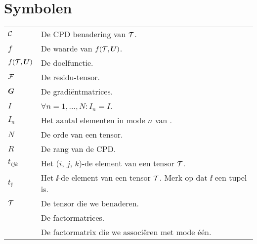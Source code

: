 \documentclass[master=cws ,masteroption=gs]{kulemt}
\begin{document}
\section*{Symbolen}
\begin{flushleft}
	\renewcommand{\arraystretch}{1.1}
	\begin{tabularx}{\textwidth}{@{}p{12mm}X@{}}
		$\mathcal{C}$	& De CPD benadering van $\mathcal{T}$.\\
		$f$				& De waarde van $f(\mathcal{T}, \boldsymbol{U})$.\\
		$f(\mathcal{T}, \boldsymbol{U})$	& De doelfunctie.\\
		$\mathcal{F}$		& De residu-tensor.\\
		$\boldsymbol{G}$			& De gradi\"entmatrices.\\
		$I$				& $\forall n = 1, \ldots, N: I_n = I$.\\
		$I_n$			& Het aantal elementen in mode $n$ van \TT.\\
		$N$				& De orde van een tensor.\\
		$R$				& De rang van de CPD.\\
		$t_{ijk}$		& Het ($i$, $j$, $k$)-de element van een tensor $\mathcal{T}$.\\
		$t_{\ii}$		& Het $\ii$-de element van een tensor $\mathcal{T}$. Merk op dat $\ii$ een tupel is.\\
		$\mathcal{T}$		& De tensor die we benaderen.\\
		\UUU{}			& De factormatrices.\\
		\UU{1}			& De factormatrix die we associ\"eren met mode \'e\'en.\\
	\end{tabularx}
\end{flushleft}

\mainmatter











\appendixpage*          %
\appendix



\backmatter


\end{document}

